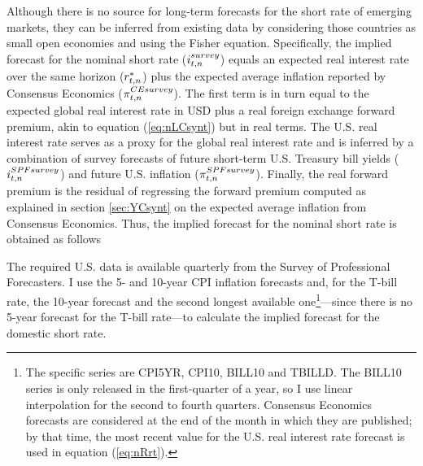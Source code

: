 {Although there is no source for long-term forecasts for the short rate of emerging markets, they can be inferred from existing data by considering those countries as small open economies and using the Fisher equation.  
Specifically, the implied forecast for the nominal short rate (\(i_{t,n}^{survey}\)) equals an expected real interest rate over the same horizon (\(r_{t,n}^{*}\)) plus the expected average inflation %
reported by Consensus Economics (\(\pi^{CE survey}_{t,n}\)).
The first term is in turn equal to the expected global real interest rate in USD plus a real foreign exchange forward premium, akin to equation (\ref{eq:nLCsynt}) but in real terms.
The U.S. real interest rate serves as a proxy for the global real interest rate and is inferred by a combination of survey forecasts of future short-term U.S. Treasury bill yields (\(i^{SPF survey}_{t,n}\)) and future U.S. inflation (\(\pi^{SPF survey}_{t,n}\)).
Finally, the real forward premium is the residual of regressing the forward premium computed as explained in section \ref{sec:YCsynt} on the expected average inflation from Consensus Economics. 
Thus, the implied forecast for the nominal short rate is obtained as follows

The required U.S. data is available quarterly from the Survey of Professional Forecasters.
I use the 5- and 10-year CPI inflation forecasts and, for the T-bill rate, the 10-year forecast and the second longest available one\footnote{ The specific series are CPI5YR, CPI10, BILL10 and TBILLD. The BILL10 series is only released in the first-quarter of a year, so I use linear interpolation for the second to fourth quarters. Consensus Economics forecasts are considered at the end of the month in which they are published; by that time, the most recent value for the U.S. real interest rate forecast is used in equation (\ref{eq:nRrt}).}---since there is no 5-year forecast for the T-bill rate---to calculate the implied forecast for the domestic short rate.
}
